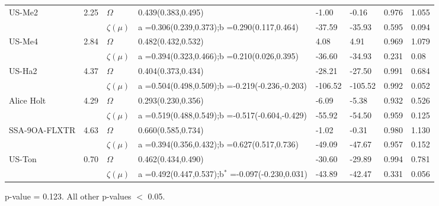 \documentclass[a4paper,11pt]{report}
\begin{document}
\begin{sidewaystable}
\begin{tabular}{p{4.0cm} p{2.1cm} p{1.5cm} p{4.1cm} p{2.1cm} p{2.1cm} p{2.1cm} p{2.1cm}}
\multirow{2}{*}{US-Me2} 
    & 2.25  &  \bf $\Omega$         &  0.439(0.383,0.495) & -1.00 & -0.16 & 0.976 & 1.055\\
    &  &  \bf $\zeta(\mu)$         &  a =0.306(0.239,0.373);\newline b =0.290(0.117,0.464) & -37.59	& -35.93 & 0.595 & 0.094\\
\multirow{2}{*}{US-Me4} 
    & 2.84  &  \bf $\Omega$         &  0.482(0.432,0.532) & 4.08 & 4.91 & 0.969 & 1.079\\
    &  &  \bf $\zeta(\mu)$         &  a =0.394(0.323,0.466);\newline b =0.210(0.026,0.395) & -36.60 & -34.93 & 0.231 & 0.08
\\
\multirow{2}{*}{US-Ha2} 
    & 4.37  &  \bf $\Omega$        &   0.404(0.373,0.434) & -28.21 & -27.50 & 0.991 & 0.684\\
    &  &  \bf $\zeta(\mu)$          &  a =0.504(0.498,0.509);\newline b =-0.219(-0.236,-0.203) & -106.52 & -105.52 & 0.992 & 0.052\\
\hline
\multirow{1}{*}{Alice Holt} 
    & 4.29  &  \bf $\Omega$         &  0.293(0.230,0.356) & -6.09 & -5.38 & 0.932 & 0.526\\
    &  &  \bf $\zeta(\mu)$          &  a =0.519(0.488,0.549);\newline b =-0.517(-0.604,-0.429) & -55.92 & -54.50 & 0.959 & 0.125\\
\hline
\multirow{1}{*}{SSA-9OA-FLXTR} 
    & 4.63  &  \bf $\Omega$         &  0.660(0.585,0.734) & -1.02 & -0.31 & 0.980 & 1.130\\
    &  &  \bf $\zeta(\mu)$         &  a =0.394(0.356,0.432);\newline b =0.627(0.517,0.736) & -49.09	& -47.67 & 0.957 & 0.152\\
\hline
\multirow{1}{*}{US-Ton} 
    & 0.70  &  \bf $\Omega$         &  0.462(0.434,0.490) & -30.60 & -29.89 & 0.994 & 0.781\\
    &  &  \bf $\zeta(\mu)$         &  a =0.492(0.447,0.537);\newline b$^*$ =-0.097(-0.230,0.031)& -43.89	& -42.47 & 0.331 & 0.056\\
\hline
\hline
 \end{tabular}
\label{tab:sites_stats}
\begin{tablenotes}
      \small
      \item *p-value = 0.123. All other p-values $<$ 0.05.
\end{tablenotes}
\end{sidewaystable}
\newpage
\end{document}
